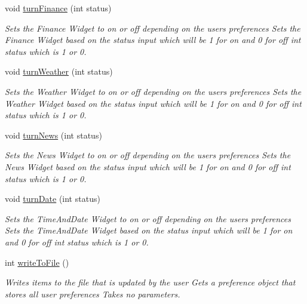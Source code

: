 \begin{DoxyCompactItemize}
void \mbox{\hyperlink{classuser_sign_in_a0a8353698be1f010c3365b119c6c6ed6}{turn\+Finance}} (int status)
\begin{DoxyCompactList}\small\item\em Sets the Finance Widget to on or off depending on the user\textquotesingle{}s preferences  Sets the Finance Widget based on the status input which will be 1 for on and 0 for off  int status which is 1 or 0. \end{DoxyCompactList}\item 
void \mbox{\hyperlink{classuser_sign_in_afa427a5204b4ded7f066963439180e6c}{turn\+Weather}} (int status)
\begin{DoxyCompactList}\small\item\em Sets the Weather Widget to on or off depending on the user\textquotesingle{}s preferences  Sets the Weather Widget based on the status input which will be 1 for on and 0 for off  int status which is 1 or 0. \end{DoxyCompactList}\item 
void \mbox{\hyperlink{classuser_sign_in_a6a95bd7b610abe178da1254e0234c858}{turn\+News}} (int status)
\begin{DoxyCompactList}\small\item\em Sets the News Widget to on or off depending on the user\textquotesingle{}s preferences  Sets the News Widget based on the status input which will be 1 for on and 0 for off  int status which is 1 or 0. \end{DoxyCompactList}\item 
void \mbox{\hyperlink{classuser_sign_in_a3d0909776d239ff774fd4134e6bd43ad}{turn\+Date}} (int status)
\begin{DoxyCompactList}\small\item\em Sets the Time\+And\+Date Widget to on or off depending on the user\textquotesingle{}s preferences  Sets the Time\+And\+Date Widget based on the status input which will be 1 for on and 0 for off  int status which is 1 or 0. \end{DoxyCompactList}\item 
int \mbox{\hyperlink{classuser_sign_in_a9f9208482f5897e06a06be400d80bebe}{write\+To\+File}} ()
\begin{DoxyCompactList}\small\item\em Writes items to the file that is updated by the user  Gets a preference object that stores all user preferences  Takes no parameters. \end{DoxyCompactList}\end{DoxyCompactItemize}


